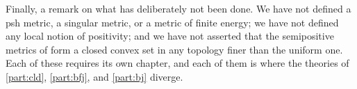 Finally, a remark on what has deliberately not been done. We have not
defined a psh metric, a singular metric, or a metric of finite energy;
we have not defined any local notion of positivity; and we have not asserted
that the semipositive metrics of  form a
closed convex set in any topology finer than the uniform one. Each of these
requires its own chapter, and each of them is where the theories of
\cref{part:cld}, \cref{part:bfj}, and \cref{part:bj} diverge.

